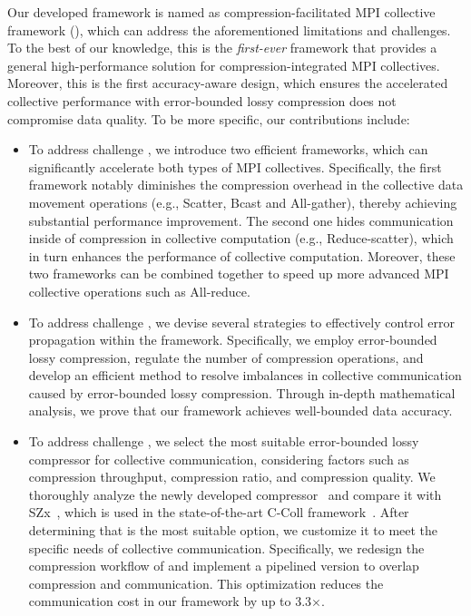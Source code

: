    
Our developed framework is named as compression-facilitated MPI collective framework ({\pname}), which can address the aforementioned limitations and challenges. To the best of our knowledge, this is the \textit{first-ever} framework that provides a general high-performance solution for compression-integrated MPI collectives. Moreover, this is the first accuracy-aware design, which ensures the accelerated collective performance with error-bounded lossy compression does not compromise data quality. To be more specific, our contributions include:
\begin{itemize}%
    \item To address challenge , we introduce two efficient frameworks, which can significantly accelerate both types of MPI collectives. Specifically, the first framework notably diminishes the compression overhead in the collective data movement operations (e.g., Scatter, Bcast and All-gather), thereby achieving substantial performance improvement. The second one hides communication inside of compression in collective computation (e.g., Reduce-scatter), which in turn enhances the performance of collective computation. Moreover, these two frameworks can be combined together to speed up more advanced MPI collective operations such as All-reduce. 
    \item To address challenge , we devise several strategies to effectively control error propagation within the {\pname} framework. Specifically, we employ error-bounded lossy compression, regulate the number of compression operations, and develop an efficient method to resolve imbalances in collective communication caused by error-bounded lossy compression. Through in-depth mathematical analysis, we prove that our {\pname} framework achieves well-bounded data accuracy.
    \item To address challenge , we select the most suitable error-bounded lossy compressor for collective communication, considering factors such as compression throughput, compression ratio, and compression quality. We thoroughly analyze the newly developed {\fzlight} compressor~\cite{SZp} and compare it with SZx~\cite{Yu2022SZx}, which is used in the state-of-the-art C-Coll framework~\cite{huang2023ccoll}. After determining that {\fzlight} is the most suitable option, we customize it to meet the specific needs of collective communication. Specifically, we redesign the compression workflow of {\fzlight} and implement a pipelined version to overlap compression and communication. This optimization reduces the communication cost in our {\pname} framework by up to 3.3$\times$.

\end{itemize}
